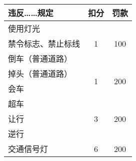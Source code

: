 \begin{table}[htbp]
    \begin{tabular}{|l|c|c|}
        \hline
        \textbf{违反……规定}  & \textbf{扣分}  & \textbf{罚款} \\ 
        \hline
        使用灯光 & \multirow{3}{*}{1} & \multirow{3}{*}{100} \\
        \cline{1-1}
        禁令标志、禁止标线 &  &  \\
        \cline{1-1}
        倒车（普通道路） &  &  \\
        \hline
        掉头（普通道路） & \multirow{2}{*}{1} & \multirow{2}{*}{200} \\
        \cline{1-1}
        会车 & & \\
        \hline
        超车 & \multirow{3}{*}{3} & \multirow{3}{*}{200} \\
        \cline{1-1}
        让行 & & \\
        \cline{1-1}
        逆行 & & \\
        \hline
        交通信号灯 & 6 & 200 \\
        \hline
    \end{tabular}
    \label{tab:Confusing_Items}
\end{table}